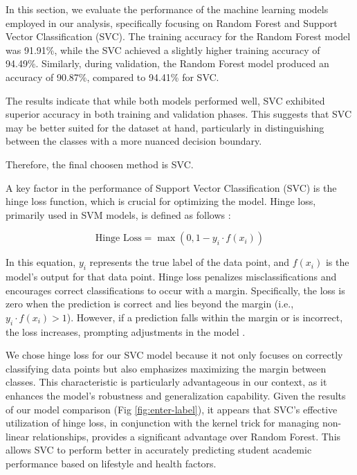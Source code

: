 \documentclass[titlepage]{article}
\begin{document}
In this section, we evaluate the performance of the machine learning models employed in our analysis, specifically focusing on Random Forest and Support Vector Classification (SVC). The training accuracy for the Random Forest model was 91.91\%, while the SVC achieved a slightly higher training accuracy of 94.49\%. Similarly, during validation, the Random Forest model produced an accuracy of 90.87\%, compared to 94.41\% for SVC. 

The results indicate that while both models performed well, SVC exhibited superior accuracy in both training and validation phases. This suggests that SVC may be better suited for the dataset at hand, particularly in distinguishing between the classes with a more nuanced decision boundary.

Therefore, the final choosen method is SVC.

A key factor in the performance of Support Vector Classification (SVC) is the hinge loss function, which is crucial for optimizing the model. Hinge loss, primarily used in SVM models, is defined as follows \cite{Hinge-loss}:

\begin{equation}
\text{Hinge Loss} = \max(0, 1 - y_i \cdot f(x_i))
\end{equation}

In this equation, \(y_i\) represents the true label of the data point, and \(f(x_i)\) is the model's output for that data point. Hinge loss penalizes misclassifications and encourages correct classifications to occur with a margin. Specifically, the loss is zero when the prediction is correct and lies beyond the margin (i.e., \(y_i \cdot f(x_i) > 1\)). However, if a prediction falls within the margin or is incorrect, the loss increases, prompting adjustments in the model \cite{Predicting_Wine_Quality}.

We chose hinge loss for our SVC model because it not only focuses on correctly classifying data points but also emphasizes maximizing the margin between classes. This characteristic is particularly advantageous in our context, as it enhances the model’s robustness and generalization capability. Given the results of our model comparison (Fig \ref{fig:enter-label}), it appears that SVC's effective utilization of hinge loss, in conjunction with the kernel trick for managing non-linear relationships, provides a significant advantage over Random Forest. This allows SVC to perform better in accurately predicting student academic performance based on lifestyle and health factors.
\end{document}

